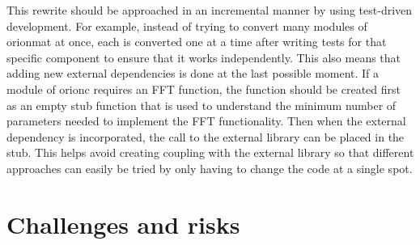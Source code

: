 This rewrite should be approached in an incremental manner by
using test-driven development. For example, instead of trying to convert many
modules of \gls{orionmat} at once, each is converted one at a
time after writing tests for that specific component to ensure
that it works independently. This also means that adding new
external dependencies is done at the last possible moment. If a
module of \gls{orionc} requires an \acrshort{FFT} function,
the function should be created first as an empty stub function
that is used to understand the minimum number of parameters needed
to implement the \acrshort{FFT} functionality. Then when the external dependency
is incorporated, the call to the external library can be placed in
the stub. This helps avoid creating coupling with the external
library so that different approaches can easily be tried by only
having to change the code at a single spot.

\section{Challenges and risks}

